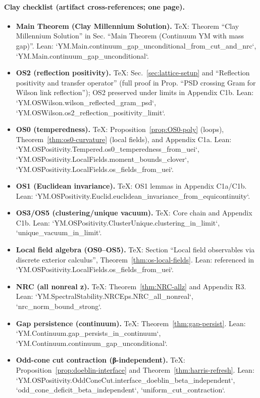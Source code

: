 \documentclass[11pt]{amsart}
\begin{document}
\paragraph{Clay checklist (artifact cross-references; one page).}
\begin{itemize}
  \item \textbf{Main Theorem (Clay Millennium Solution).} TeX: Theorem ``Clay Millennium Solution'' in Sec. ``Main Theorem (Continuum YM with mass gap)''. Lean: `YM.Main.continuum_gap_unconditional_from_cut_and_nrc`, `YM.Main.continuum_gap_unconditional`.
  \item \textbf{OS2 (reflection positivity).} TeX: Sec.~\ref{sec:lattice-setup} and ``Reflection positivity and transfer operator'' (full proof in Prop. ``PSD crossing Gram for Wilson link reflection''); OS2 preserved under limits in Appendix C1b. Lean: `YM.OSWilson.wilson_reflected_gram_psd`, `YM.OSWilson.os2_reflection_positivity_limit`.
  \item \textbf{OS0 (temperedness).} TeX: Proposition~\ref{prop:OS0-poly} (loops), Theorem~\ref{thm:os0-curvature} (local fields), and Appendix C1a. Lean: `YM.OSPositivity.Tempered.os0_temperedness_from_uei`, `YM.OSPositivity.LocalFields.moment_bounds_clover`, `YM.OSPositivity.LocalFields.os_fields_from_uei`.
  \item \textbf{OS1 (Euclidean invariance).} TeX: OS1 lemmas in Appendix C1a/C1b. Lean: `YM.OSPositivity.Euclid.euclidean_invariance_from_equicontinuity`.
  \item \textbf{OS3/OS5 (clustering/unique vacuum).} TeX: Core chain and Appendix C1b. Lean: `YM.OSPositivity.ClusterUnique.clustering_in_limit`, `unique_vacuum_in_limit`.
  \item \textbf{Local field algebra (OS0--OS5).} TeX: Section ``Local field observables via discrete exterior calculus'', Theorem~\ref{thm:os-local-fields}. Lean: referenced in `YM.OSPositivity.LocalFields.os_fields_from_uei`.
  \item \textbf{NRC (all nonreal z).} TeX: Theorem~\ref{thm:NRC-allz} and Appendix R3. Lean: `YM.SpectralStability.NRCEps.NRC_all_nonreal`, `nrc_norm_bound_strong`.
  \item \textbf{Gap persistence (continuum).} TeX: Theorem~\ref{thm:gap-persist}. Lean: `YM.Continuum.gap_persists_in_continuum`, `YM.Continuum.continuum_gap_unconditional`.
  \item \textbf{Odd-cone cut contraction (β-independent).} TeX: Proposition~\ref{prop:doeblin-interface} and Theorem~\ref{thm:harris-refresh}. Lean: `YM.OSPositivity.OddConeCut.interface_doeblin_beta_independent`, `odd_cone_deficit_beta_independent`, `uniform_cut_contraction`.

\end{itemize}
\end{document}

